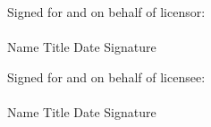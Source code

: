 \documentclass[12pt]{article}
\begin{document}
\clearpage
\noindent Signed for and on behalf of licensor:\\[1em]
\makebox[2.5in]{\hrulefill} \hspace{1em} \makebox[2in]{\hrulefill}\\
Name \hspace{3.5em} Title \hspace{3em} Date  \hspace{2em} Signature

\vspace{2em}

\noindent Signed for and on behalf of licensee:\\[1em]
\makebox[2.5in]{\hrulefill} \hspace{1em} \makebox[2in]{\hrulefill}\\
Name \hspace{3.5em} Title \hspace{3em} Date \hspace{2em} Signature
\end{document}
